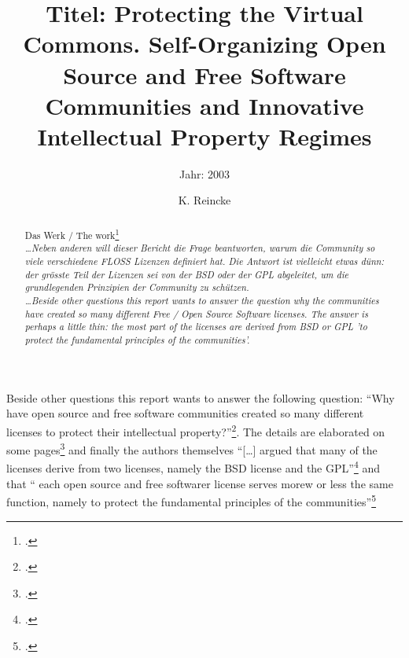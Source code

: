 \documentclass[DIV=calc,BCOR=5mm,11pt,headings=small,oneside,abstract=true, toc=bib]{scrartcl}
\begin{document}

\titlehead{Literaturexzerpt}
\subject{Autor(en): R. van Wendel de Joode and J. A. de Bruijn and M. J. G. van
Eeten}
\title{Titel: Protecting the Virtual Commons. Self-Organizing Open Source
and Free Software Communities and Innovative Intellectual Property Regimes}
\subtitle{Jahr: 2003 }
\author{K. Reincke}

\maketitle

\begin{abstract}
Das Werk / The work\footcite[][]{VwdjDebVEee2003a} \\
\noindent \itshape
\ldots Neben anderen will dieser Bericht die Frage beantworten, warum die
Community so viele verschiedene FLOSS Lizenzen definiert hat. Die Antwort ist
vielleicht etwas dünn: der grösste Teil der Lizenzen sei von der BSD oder der
GPL abgeleitet, um die grundlegenden Prinzipien der Community zu schützen. \\
\noindent
\ldots Beside other questions this report wants to answer the question why the
communities have created so many different Free / Open Source Software licenses.
The answer is perhaps a little thin: the most part of the licenses are derived
from BSD or GPL 'to protect the fundamental principles of the communities'.
\end{abstract}
\footnotesize
\normalsize

Beside other questions this report wants to answer the following question:
\enquote{Why have open source and free software communities created so many
different licenses to protect their intellectual
property?}\footcite[cf.][2]{VwdjDebVEee2003a}. The details are elaborated
on some pages\footcite[cf.][72ff]{VwdjDebVEee2003a} and finally the authors
themselves \enquote{[\ldots] argued that many of the licenses derive from two
licenses, namely the BSD license and the
GPL}\footcite[cf.][109]{VwdjDebVEee2003a} and that \enquote{ each open
source and free softwarer license serves morew or less the same function, namely
to protect the fundamental principles of the
communities}\footcite[cf.][11o]{VwdjDebVEee2003a}

\small

\end{document}
